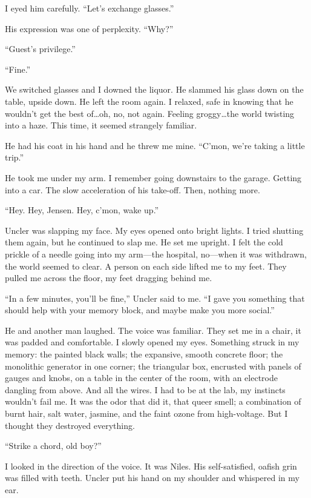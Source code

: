 \documentclass[
]{article}
\begin{document}
I eyed him carefully. ``Let's exchange glasses.''

His expression was one of perplexity. ``Why?''

``Guest's privilege.''

``Fine.''

We switched glasses and I downed the liquor. He slammed his glass down
on the table, upside down. He left the room again. I relaxed, safe in
knowing that he wouldn't get the best of\ldots oh, no, not again.
Feeling groggy\ldots the world twisting into a haze. This time, it
seemed strangely familiar.

He had his coat in his hand and he threw me mine. ``C'mon, we're taking
a little trip.''

He took me under my arm. I remember going downstairs to the garage.
Getting into a car. The slow acceleration of his take-off. Then, nothing
more.

``Hey. Hey, Jensen. Hey, c'mon, wake up.''

Uncler was slapping my face. My eyes opened onto bright lights. I tried
shutting them again, but he continued to slap me. He set me upright. I
felt the cold prickle of a needle going into my arm---the hospital,
no---when it was withdrawn, the world seemed to clear. A person on each
side lifted me to my feet. They pulled me across the floor, my feet
dragging behind me.

``In a few minutes, you'll be fine,'' Uncler said to me. ``I gave you
something that should help with your memory block, and maybe make you
more social.''

He and another man laughed. The voice was familiar. They set me in a
chair, it was padded and comfortable. I slowly opened my eyes. Something
struck in my memory: the painted black walls; the expansive, smooth
concrete floor; the monolithic generator in one corner; the triangular
box, encrusted with panels of gauges and knobs, on a table in the center
of the room, with an electrode dangling from above. And all the wires. I
had to be at the lab, my instincts wouldn't fail me. It was the odor
that did it, that queer smell; a combination of burnt hair, salt water,
jasmine, and the faint ozone from high-voltage. But I thought they
destroyed everything.

``Strike a chord, old boy?''

I looked in the direction of the voice. It was Niles. His
self-satisfied, oafish grin was filled with teeth. Uncler put his hand
on my shoulder and whispered in my ear.
\end{document}
